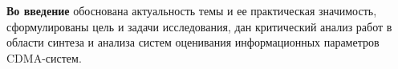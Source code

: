 {\bf{Во введение}} обоснована актуальность темы и ее практическая значимость, сформулированы цель и задачи исследования, дан критический анализ
работ в области синтеза и анализа систем оценивания информационных параметров CDMA-систем.

%
%
%
%
%
%
